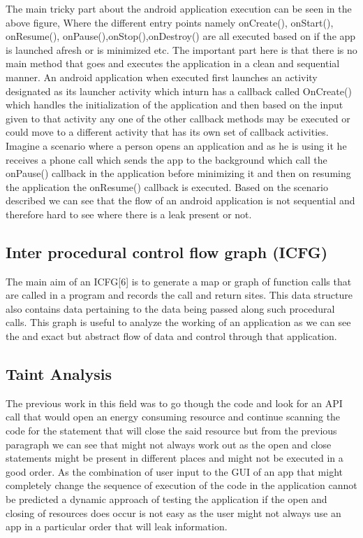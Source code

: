\documentclass[journal]{IEEEtran}
\begin{document}
The main tricky part about the android application execution can be seen in the above figure, Where the different entry points namely onCreate(), onStart(), onResume(), onPause(),onStop(),onDestroy() are all executed based on if the app is launched afresh or is minimized etc. The important part here is that there is no main method that goes and executes the application in a clean and sequential manner. An android application when executed first launches an activity designated as its launcher activity which inturn has a callback called OnCreate() which handles the initialization of the application and then based on the input given to that activity any one of the other callback methods may be executed or could move to a different activity that has its own set of callback activities.\\
Imagine a scenario where a person opens an application and as he is using it he receives a phone call which sends the app to the background which call the onPause() callback in the application before minimizing it and then on resuming the application the onResume() callback is executed. Based on the scenario described we can see that the flow of an android application is not sequential and therefore hard to see where there is a leak present or not.  \\

\subsection{Inter procedural control flow graph (ICFG)}
	The main aim of an ICFG[6] is to generate a map or graph of function calls that are called in a program and records the call and return sites. This data structure also contains data pertaining to the data being passed along such procedural calls. This graph is useful to analyze the working of an application as we can see the and exact but abstract flow of data and control through that application.  

\subsection{Taint Analysis}
The previous work in this field was to go though the code and look for an API call that would open an energy consuming resource and continue scanning the code for the statement that will close the said resource but from the previous paragraph we can see that might not always work out as the open and close statements might be present in different places and might not be executed in a good order.  As the combination of user input to the GUI of an app that might completely change the sequence of execution of the code in the application cannot be predicted a dynamic approach of testing the application if the open and closing of resources does occur is not easy as the user might not always use an app in a particular order that will leak information.\\
\end{document}
